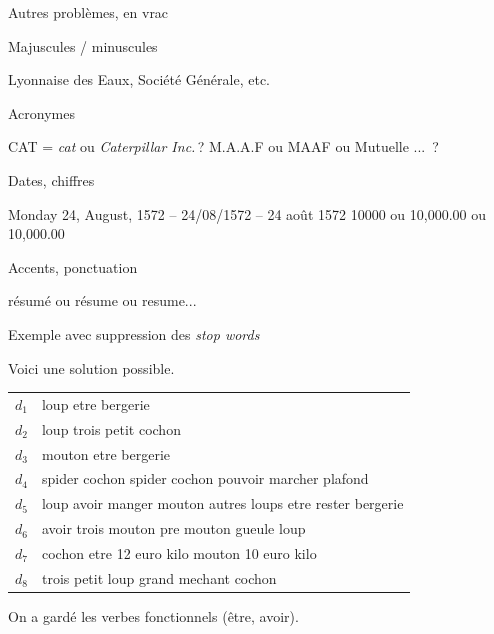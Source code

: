 \begin{frame}{Autres problèmes, en vrac}


\alert{Majuscules / minuscules}

Lyonnaise des Eaux, Société Générale, etc.

\vfill
 \alert{Acronymes}
 
   CAT = \textit{cat} ou \textit{Caterpillar Inc.}\,?  M.A.A.F ou MAAF ou Mutuelle ... \,?

\vfill

\alert{Dates, chiffres}

   Monday 24, August, 1572 -- 24/08/1572 -- 24 août 1572
    10000 ou 10,000.00 ou 10,000.00
     
     
     \vfill
     
     \alert{Accents, ponctuation}
     
     résumé ou résume ou resume... 
     
\begin{blocgauche}
\end{blocgauche}

 \end{frame}


\begin{frame}{Exemple avec suppression des \textit{stop words}}

Voici une solution possible.

\vfill

\begin{tabular}{>{\color{structure.fg}}ll}
     $d_1$&loup etre bergerie\\
     $d_2$&loup  trois petit cochon\\
     $d_3$&mouton etre bergerie\\
     $d_4$&spider cochon spider cochon pouvoir marcher plafond\\
     $d_5$&loup avoir manger mouton  autres loups etre rester bergerie\\
     $d_6$&avoir trois mouton pre mouton gueule loup\\
     $d_7$&cochon etre 12 euro kilo mouton 10 euro kilo\\
     $d_8$&trois petit loup grand mechant cochon\\
\end{tabular}

\vfill

On a gardé les verbes fonctionnels (être, avoir).
\end{frame}



